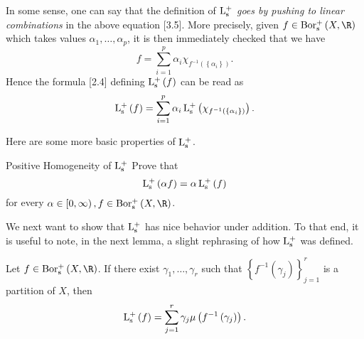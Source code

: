 \documentclass[pmath450]{subfiles}
\begin{document}
    \rruleline

    \np In some sense, one can say that the definition of \textit{$\operatorname{L^+_s}$ goes by pushing to linear combinations} in the above equation [3.5]. More precisely, given $f\in\borpluss\left( X,\R \right)$ which takes values $\alpha_1,\ldots,\alpha_p$, it is then immediately checked that we have
    \begin{equation*}
        f = \sum^{p}_{i=1}\alpha_i\chi_{f^{-1}\left( \left\lbrace \alpha_i \right\rbrace \right)}.
    \end{equation*}
    Hence the formula [2.4] defining $\operatorname{L^+_s}\left( f \right)$ can be read as
    \begin{equation*}
        \operatorname{L^+_s}\left( f \right) = \sum^{p}_{i=1}\alpha_i\operatorname{L^+_s}\left( \chi_{f^{-1}\left( \left\lbrace \alpha_i \right\rbrace \right)} \right).
    \end{equation*}

    \np Here are some more basic properties of $\operatorname{L^+_s}$.

    \begin{exercise}{Positive Homogeneity of $\operatorname{L^+_s}$}
        Prove that
        \begin{equation*}
            \operatorname{L^+_s}\left( \alpha f \right) = \alpha\operatorname{L^+_s}\left( f \right)
        \end{equation*}
        for every $\alpha\in\left[ 0,\infty \right),f\in\borpluss\left( X,\R \right)$.
    \end{exercise}

    \rruleline

    \np We next want to show that $\operatorname{L^+_s}$ has nice behavior under addition. To that end, it is useful to note, in the next lemma, a slight rephrasing of how $\operatorname{L^+_s}$ was defined.

    \begin{lemma}{}
        Let $f\in\borpluss\left( X,\R \right)$. If there exist $\gamma_1,\ldots,\gamma_r$ such that $\left\lbrace f^{-1}\left( \gamma_j \right) \right\rbrace^{r}_{j=1}$ is a partition of $X$, then
        \begin{equation*}
            \operatorname{L^+_s}\left( f \right) = \sum^{r}_{j=1} \gamma_j\mu\left( f^{-1}\left( \gamma_j \right) \right).
        \end{equation*}
    \end{lemma}
\end{document}
